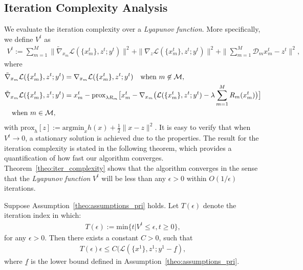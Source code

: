 \subsection{Iteration Complexity Analysis}
We evaluate the iteration complexity over a \emph{Lyapunov function}. More specifically, we define $V^t$ as
\begin{align}
    V^t:=\sum_{m=1}^{M} \|\tilde{\nabla}_{x_m} \mathcal{L}(\{x_m^t\}, z^t; y^t)\|^2 + \|\nabla_z \mathcal{L}(\{x_m^t\}, z^t; y^t)\|^2 + \|\sum_{m=1}^{M} \mathcal{D}_mx_m^t - z^t\|^2,\label{eq:Lyapunov}
\end{align}
where
\begin{align}
    & \tilde{\nabla}_{x_m} \mathcal{L}(\{x_m^t\}, z^t; y^t) = \nabla_{x_m} \mathcal{L}(\{x_m^t\}, z^t; y^t)\quad\hfill\text{when}~ m\not\in\mathcal{M},\nonumber\\
    & \tilde{\nabla}_{x_m} \mathcal{L}(\{x_m^t\}, z^t; y^t) = x_m^t - \text{prox}_{\lambda R_m} \big[x_m^t-\nabla_{x_m}\big(\mathcal{L}(\{x_m^t\}, z^t; y^t) - \lambda\sum_{m=1}^{M} R_m(x_m^t)\big)\big]\nonumber\\ 
    &\quad\hfill \text{when} ~m\in\mathcal{M},\nonumber
\end{align}
with $\text{prox}_h[z] := \text{argmin}_x h(x)+\frac{1}{2}\|x-z\|^2$. It is easy to verify that when $V^t\rightarrow 0$, a stationary solution is achieved due to the properties. The result for the iteration complexity is stated in the following theorem, which provides a quantification of how fast our algorithm converges. Theorem~\ref{theo:iter_complexity} shows that the algorithm converges in the sense that the \emph{Lyapunov function} $V^t$ will be less than any $\epsilon>0$ within $O(1/\epsilon)$ iterations. 
\begin{theorem}\label{theo:iter_complexity}
    Suppose Assumption~\ref{theo:assumptions_pri} holds. Let $T(\epsilon)$ denote the iteration index in which:
    \begin{align}
        T(\epsilon):=\text{min}\{t|V^t\le\epsilon, t\ge0\},\nonumber
    \end{align}
    for any $\epsilon>0$. Then there exists a constant $C>0$, such that
    \begin{align}
        T(\epsilon)\epsilon\le C(\mathcal{L}(\{x^1\}, z^1; y^1 - \underline{f}),
    \end{align}
    where $\underline{f}$ is the lower bound defined in Assumption~\ref{theo:assumptions_pri}.%
\end{theorem} 